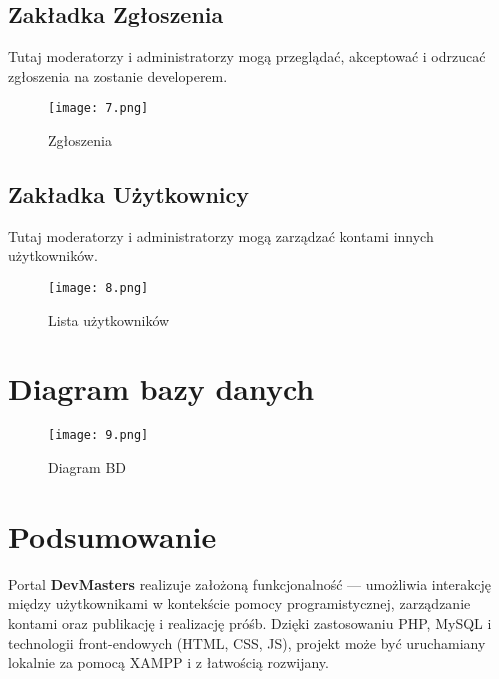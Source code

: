 \documentclass[a4paper,12pt]{article}
\begin{document}
\subsection{Zakładka Zgłoszenia}

Tutaj moderatorzy i administratorzy mogą przeglądać, akceptować i odrzucać zgłoszenia na zostanie developerem.

\begin{figure}[H]
    \centering
    \texttt{[image: 7.png]}
    \caption{Zgłoszenia}
\end{figure}

\newpage

\subsection{Zakładka Użytkownicy}

Tutaj moderatorzy i administratorzy mogą zarządzać kontami innych użytkowników.

\begin{figure}[H]
    \centering
    \texttt{[image: 8.png]}
    \caption{Lista użytkowników}
\end{figure}

\section{Diagram bazy danych}

\begin{figure}[H]
    \centering
    \texttt{[image: 9.png]}
    \caption{Diagram BD}
\end{figure}

\section{Podsumowanie}
Portal \textbf{DevMasters} realizuje założoną funkcjonalność — umożliwia interakcję między użytkownikami w kontekście pomocy programistycznej, zarządzanie kontami oraz publikację i realizację próśb. Dzięki zastosowaniu PHP, MySQL i technologii front-endowych (HTML, CSS, JS), projekt może być uruchamiany lokalnie za pomocą XAMPP i z łatwością rozwijany. 


\newpage

\listoffigures
\end{document}
